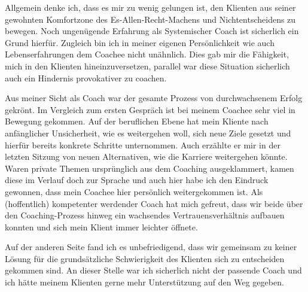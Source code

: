 \documentclass[11pt,a4paper]{article}
\begin{document}
Allgemein denke ich, dass es mir zu wenig gelungen ist, den Klienten aus seiner gewohnten Komfortzone des Es-Allen-Recht-Machens und Nichtentscheidens zu bewegen. Noch ungenügende Erfahrung als Systemischer Coach ist sicherlich ein Grund hierfür. Zugleich bin ich in meiner eigenen Persönlichkeit wie auch Lebenserfahrungen dem Coachee nicht unähnlich. Dies gab mir die Fähigkeit, mich in den Klienten hineinzuversetzen, parallel war diese Situation sicherlich auch ein Hindernis provokativer zu coachen.  

Aus meiner Sicht als Coach war der gesamte Prozess von durchwachsenem Erfolg gekrönt. Im Vergleich zum ersten Gespräch ist bei meinem Coachee sehr viel in Bewegung gekommen. Auf der beruflichen Ebene hat mein Kliente nach anfänglicher Unsicherheit, wie es weitergehen woll, sich neue Ziele gesetzt und hierfür bereits konkrete Schritte unternommen. Auch erzählte er mir in der letzten Sitzung von neuen Alternativen, wie die Karriere weitergehen könnte. Waren private Themen ursprünglich aus dem Coaching ausgeklammert, kamen diese im Verlauf doch zur Sprache und auch hier habe ich den Eindruck gewonnen, dass mein Coachee hier persönlich weitergekommen ist. Als (hoffentlich) kompetenter werdender Coach hat mich gefreut, dass wir beide über den Coaching-Prozess hinweg ein wachsendes Vertrauensverhältnis aufbauen konnten und sich mein Klient immer leichter öffnete. 

Auf der anderen Seite fand ich es unbefriedigend, dass wir gemeinsam zu keiner Lösung für die grundsätzliche Schwierigkeit des Klienten sich zu entscheiden gekommen sind. An dieser Stelle war ich sicherlich nicht der passende Coach und ich hätte meinem Klienten gerne mehr Unterstützung auf den Weg gegeben.
\end{document}
